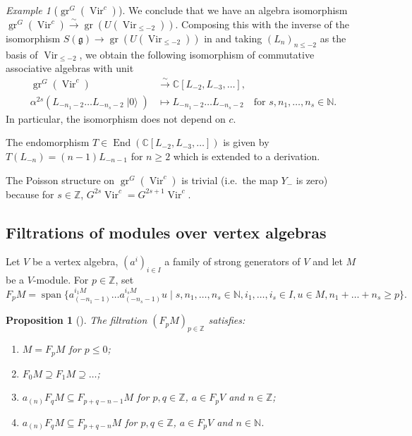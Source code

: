 \documentclass[a4paper, 12pt, reqno]{amsart}
\newtheorem{proposition}[theorem]{Proposition}
\theoremstyle{remark}
\newtheorem{example}[theorem]{Example}
\numberwithin{equation}{subsection}
\DeclareMathOperator{\Vir}{Vir}
\DeclareMathOperator{\gr}{gr}
\DeclareMathOperator{\End}{End}
\DeclareMathOperator{\vspan}{span}
\DeclareMathOperator{\vac}{|0\rangle}
\begin{document}
\begin{example}[$\gr^G(\Vir^c)$]
  We conclude that we have an algebra isomorphism $\gr^G(\Vir^c) \xrightarrow{\sim} \gr(U(\Vir_{\le -2}))$.
  Composing this with the inverse of the isomorphism $S(\mathfrak{g}) \to \gr(U(\Vir_{\le -2}))$ in  and taking $(L_n)_{n \le -2}$ as the basis of $\Vir_{\le -2}$, we obtain the following isomorphism of commutative associative algebras with unit
  \begin{align*}
  \gr^G(\Vir^c) &\xrightarrow{\sim} \mathbb{C}[L_{-2}, L_{-3}, \dots], \\
  \alpha^{2s}(L_{-n_1 - 2}\dots L_{-n_s - 2}\vac) &\mapsto L_{-n_1 - 2}\dots L_{-n_s - 2} \quad \text{for }s, n_1, \dots, n_s \in \mathbb{N}.
  \end{align*}
  In particular, the isomorphism does not depend on $c$.

  The endomorphism $T \in \End(\mathbb{C}[L_{-2}, L_{-3}, \dots])$ is given by $T(L_{-n}) = (n - 1)L_{-n - 1}$ for $n \ge 2$ which is extended to a derivation.

  The Poisson structure on $\gr^G(\Vir^c)$ is trivial (i.e.\ the map $Y_-$ is zero) because for $s \in \mathbb{Z}$, $G^{2s}\Vir^c = G^{2s + 1}\Vir^c$.
\end{example}

\subsection{Filtrations of modules over vertex algebras}
\label{sec:filtr-modul-over}

Let $V$ be a vertex algebra, $(a^i)_{i \in I}$ a family of strong generators of $V$ and let $M$ be a $V$-module.
For $p \in \mathbb{Z}$, set
\begin{equation*}
  F_pM = \vspan \{a^{i_1M}_{(-n_1 - 1)}\dots a^{i_sM}_{(-n_s - 1)}u \mid s, n_1, \dots, n_s \in \mathbb{N}, i_1, \dots, i_s \in I, u \in M, n_1 + \dots + n_s \ge p\}.
\end{equation*}

\begin{proposition}[{\cite{li_abelianizing_2005}}]
  \label{prp:12}
  The filtration $(F_pM)_{p \in \mathbb{Z}}$ satisfies:
  \begin{enumerate}
  \item $M = F_pM$ for $p \le 0$;
  \item $F_0M \supseteq F_1M \supseteq \dots$;
  \item $a_{(n)}F_qM \subseteq F_{p + q - n - 1}M$ for $p, q \in \mathbb{Z}$, $a \in F_pV$ and $n \in \mathbb{Z}$;
  \item $a_{(n)}F_qM \subseteq F_{p + q - n}M$ for $p, q \in \mathbb{Z}$, $a \in F_pV$ and $n \in \mathbb{N}$.
  \end{enumerate}
\end{proposition}
\end{document}
